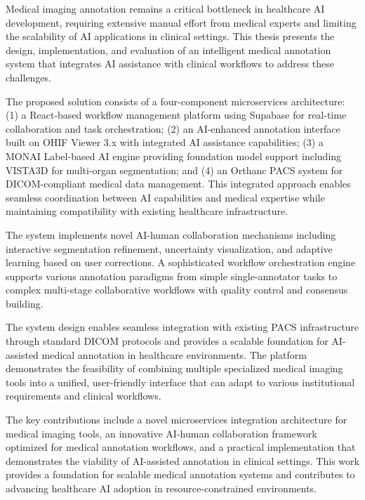 \begin{EnAbstract}
Medical imaging annotation remains a critical bottleneck in healthcare AI development, requiring extensive manual effort from medical experts and limiting the scalability of AI applications in clinical settings. This thesis presents the design, implementation, and evaluation of an intelligent medical annotation system that integrates AI assistance with clinical workflows to address these challenges.

The proposed solution consists of a four-component microservices architecture: (1) a React-based workflow management platform using Supabase for real-time collaboration and task orchestration; (2) an AI-enhanced annotation interface built on OHIF Viewer 3.x with integrated AI assistance capabilities; (3) a MONAI Label-based AI engine providing foundation model support including VISTA3D for multi-organ segmentation; and (4) an Orthanc PACS system for DICOM-compliant medical data management. This integrated approach enables seamless coordination between AI capabilities and medical expertise while maintaining compatibility with existing healthcare infrastructure.

The system implements novel AI-human collaboration mechanisms including interactive segmentation refinement, uncertainty visualization, and adaptive learning based on user corrections. A sophisticated workflow orchestration engine supports various annotation paradigms from simple single-annotator tasks to complex multi-stage collaborative workflows with quality control and consensus building.

The system design enables seamless integration with existing PACS infrastructure through standard DICOM protocols and provides a scalable foundation for AI-assisted medical annotation in healthcare environments. The platform demonstrates the feasibility of combining multiple specialized medical imaging tools into a unified, user-friendly interface that can adapt to various institutional requirements and clinical workflows.

The key contributions include a novel microservices integration architecture for medical imaging tools, an innovative AI-human collaboration framework optimized for medical annotation workflows, and a practical implementation that demonstrates the viability of AI-assisted annotation in clinical settings. This work provides a foundation for scalable medical annotation systems and contributes to advancing healthcare AI adoption in resource-constrained environments.

\end{EnAbstract}